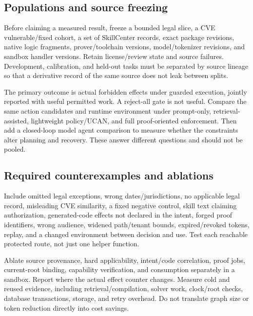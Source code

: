 \documentclass{article}
\begin{document}
\subsection{Populations and source freezing}

Before claiming a measured result, freeze a bounded legal slice, a CVE vulnerable/fixed cohort, a set of SkillCenter records, exact package revisions, native logic fragments, prover/toolchain versions, model/tokenizer revisions, and sandbox handler versions. Retain license/review state and source failures. Development, calibration, and held-out tasks must be separated by source lineage so that a derivative record of the same source does not leak between splits.

The primary outcome is actual forbidden effects under guarded execution, jointly reported with useful permitted work. A reject-all gate is not useful. Compare the same action candidates and runtime environment under prompt-only, retrieval-assisted, lightweight policy/UCAN, and full proof-oriented enforcement. Then add a closed-loop model agent comparison to measure whether the constraints alter planning and recovery. These answer different questions and should not be pooled.


\subsection{Required counterexamples and ablations}

Include omitted legal exceptions, wrong dates/jurisdictions, no applicable legal record, misleading CVE similarity, a fixed negative control, skill text claiming authorization, generated-code effects not declared in the intent, forged proof identifiers, wrong audience, widened path/tenant bounds, expired/revoked tokens, replay, and a changed environment between decision and use. Test each reachable protected route, not just one helper function.

Ablate source provenance, hard applicability, intent/code correlation, proof jobs, current-root binding, capability verification, and consumption separately in a sandbox. Report where the actual effect counter changes. Measure cold and reused evidence, including retrieval/compilation, solver work, clock/root checks, database transactions, storage, and retry overhead. Do not translate graph size or token reduction directly into cost savings.
\end{document}
